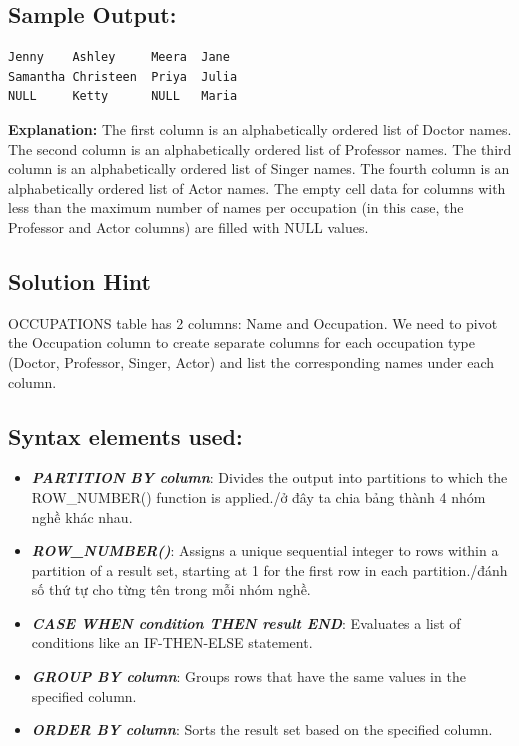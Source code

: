 \documentclass[12pt,a4paper]{article}
\begin{document}
\subsection*{Sample Output:}
\begin{verbatim}
Jenny    Ashley     Meera  Jane
Samantha Christeen  Priya  Julia
NULL     Ketty      NULL   Maria
\end{verbatim}
\textbf{Explanation:}
The first column is an alphabetically ordered list of Doctor names.\newline
The second column is an alphabetically ordered list of Professor names. \newline
The third column is an alphabetically ordered list of Singer names. \newline
The fourth column is an alphabetically ordered list of Actor names. \newline
The empty cell data for columns with less than the maximum number of names per occupation (in this case, the Professor and Actor columns) are filled with NULL values.
\subsection*{Solution Hint}
OCCUPATIONS table has 2 columns: Name and Occupation. We need to pivot the Occupation column to create separate columns for each occupation type (Doctor, Professor, Singer, Actor) and list the corresponding names under each column.
\subsection*{Syntax elements used:}
\begin{itemize}
    \item \textit{\textbf{PARTITION BY column}}: Divides the output into partitions to which the ROW\_NUMBER() function is applied./ở đây ta chia bảng thành 4 nhóm nghề khác nhau.
    \item \textit{\textbf{ROW\_NUMBER()}}: Assigns a unique sequential integer to rows within a partition of a result set, starting at 1 for the first row in each partition./đánh số thứ tự cho từng tên trong mỗi nhóm nghề.
    \item \textit{\textbf{CASE WHEN condition THEN result END}}: Evaluates a list of conditions like an IF-THEN-ELSE statement.
    \item \textit{\textbf{GROUP BY column}}: Groups rows that have the same values in the specified column.
    \item \textit{\textbf{ORDER BY column}}: Sorts the result set based on the specified column.
\end{itemize}
\end{document}
